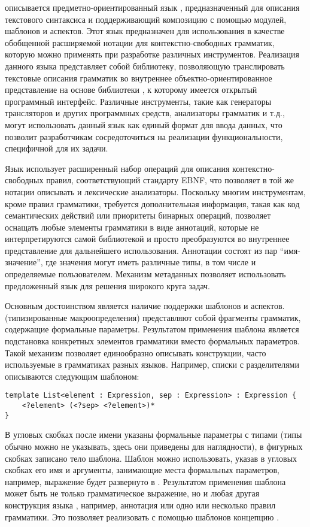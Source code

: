 описывается предметно-ориентированный язык \GRM{}, предназначенный для описания текстового синтаксиса и поддерживающий композицию с помощью модулей, шаблонов и аспектов. 
Этот язык предназначен для использования в качестве обобщенной
расширяемой нотации для контекстно-свободных грамматик, которую можно применять при разработке различных инструментов. Реализация данного языка представляет собой библиотеку, позволяющую транслировать текстовые описания грамматик во внутреннее объектно-ориентированное представление на основе библиотеки , к которому имеется открытый программный интерфейс. 
Различные инструменты, такие как генераторы трансляторов и других программных средств, анализаторы грамматик и т.д., могут использовать данный язык как единый формат для ввода данных, что позволит разработчикам сосредоточиться на реализации функциональности, специфичной для их задачи. 

Язык \GRM{} использует расширенный набор операций для описания контекстно-свободных правил, соответствующий стандарту EBNF, что позволяет в той же нотации описывать и лексические анализаторы. Поскольку многим инструментам, кроме правил грамматики, требуется дополнительная информация, такая как код семантических действий или приоритеты бинарных операций, \GRM{} позволяет оснащать любые элементы грамматики  в виде аннотаций, которые не интерпретируются самой библиотекой и просто преобразуются во внутреннее представление для дальнейшего использования. Аннотации состоят из пар ``имя-значение'', где значения могут иметь различные типы, в том числе и определяемые пользователем. Механизм метаданных позволяет использовать предложенный язык для решения широкого круга задач.

Основным достоинством \GRM{} является наличие поддержки шаблонов и аспектов.
 (типизированные макроопределения) представляют собой фрагменты грамматик, содержащие формальные параметры. Результатом применения шаблона является подстановка конкретных элементов грамматики вместо формальных параметров. Такой механизм позволяет единообразно описывать конструкции, часто используемые в грамматиках разных языков. Например, списки с разделителями описываются следующим шаблоном:
\begin{lstlisting}
template List<element : Expression, sep : Expression> : Expression {
	<?element> (<?sep> <?element>)*
}
\end{lstlisting}
В угловых скобках после имени  указаны формальные параметры с типами (типы обычно можно не указывать, здесь они приведены для наглядности), в фигурных скобках записано тело шаблона. 
Шаблон можно использовать, указав в угловых скобках его имя и аргументы, занимающие места формальных параметров, например, выражение  будет развернуто в . Результатом применения шаблона может быть не только грамматическое выражение, но и любая другая конструкция языка \GRM{}, например, аннотация или одно или несколько правил грамматики. Это позволяет реализовать с помощью шаблонов концепцию . 

